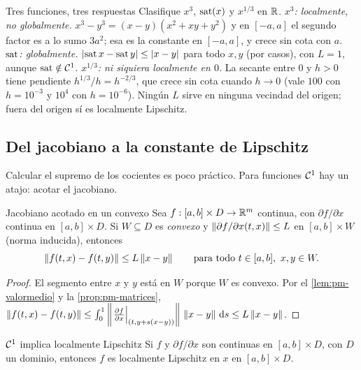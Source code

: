 \begin{ejemplo}[label=ej:pm-tres]{Tres funciones, tres respuestas}
Clasifique $x^3$, $\operatorname{sat}(x)$ y $x^{1/3}$ en $\mathbb{R}$.
\solucion \emph{$x^3$: localmente, no globalmente.} $x^3-y^3=(x-y)(x^2+xy+y^2)$ y en $[-a,a]$ el segundo factor es a lo sumo $3a^2$; esa es la constante en $[-a,a]$, y crece sin cota con $a$. \emph{$\operatorname{sat}$: globalmente.} $\left\lvert \operatorname{sat} x-\operatorname{sat} y\right\rvert\le\left\lvert x-y\right\rvert$ para todo $x,y$ (por casos), con $L=1$, aunque $\operatorname{sat}\notin\mathcal{C}^{1}$. \emph{$x^{1/3}$: ni siquiera localmente en $0$.} La secante entre $0$ y $h>0$ tiene pendiente $h^{1/3}/h=h^{-2/3}$, que crece sin cota cuando $h\to0$ (vale $100$ con $h=10^{-3}$ y $10^4$ con $h=10^{-6}$). Ningún $L$ sirve en ninguna vecindad del origen; fuera del origen sí es localmente Lipschitz.
\end{ejemplo}


\subsection{Del jacobiano a la constante de Lipschitz}

Calcular el supremo de los cocientes es poco práctico. Para funciones $\mathcal{C}^{1}$ hay un atajo: acotar el jacobiano.

\begin{lema}[label=lem:pm-jacobiano]{Jacobiano acotado en un convexo \citep[Lema~3.1]{Kha02}}
Sea $f:[a,b]\times D\to\mathbb{R}^m$ continua, con $\partial f/\partial x$ continua en $[a,b]\times D$. Si $W\subseteq D$ es \emph{convexo} y $\left\lVert \partial f/\partial x(t,x)\right\rVert\le L$ en $[a,b]\times W$ (norma inducida), entonces
\[
  \left\lVert f(t,x)-f(t,y)\right\rVert\le L\left\lVert x-y\right\rVert\qquad\text{para todo }t\in[a,b],\ x,y\in W .
\]
\end{lema}

\begin{proof}
El segmento entre $x$ y $y$ está en $W$ porque $W$ es convexo. Por el \cref{lem:pm-valormedio} y la \cref{prop:pm-matrices},
$\left\lVert f(t,x)-f(t,y)\right\rVert\le\int_0^1\left\lVert \left.\frac{\partial f}{\partial x}\right|_{(t,y+s(x-y))}\right\rVert\,\left\lVert x-y\right\rVert\,\mathrm{d} s\le L\left\lVert x-y\right\rVert$.
\end{proof}

\begin{lema}[label=lem:pm-c1lip]{$\mathcal{C}^{1}$ implica localmente Lipschitz \citep[Lema~3.2]{Kha02}}
Si $f$ y $\partial f/\partial x$ son continuas en $[a,b]\times D$, con $D$ un dominio, entonces $f$ es localmente Lipschitz en $x$ en $[a,b]\times D$.
\end{lema}

